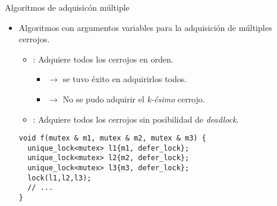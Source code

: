 \begin{frame}[fragile]{Algoritmos de adquisicón múltiple}
\begin{itemize}
  \item Algoritmos con argumentos variables para la adquisición de múltiples cerrojos.
    \begin{itemize}
      \item {}: Adquiere todos los cerrojos en orden. 
        \begin{itemize}
          \item {} $\rightarrow$ se tuvo éxito en adquirirlos todos.
          \item {} $\rightarrow$  No se pudo adquirir el \emph{k-ésimo} cerrojo.
        \end{itemize}
      \item {}: Adquiere todos los cerrojos sin posibilidad de \emph{deadlock}.
    \end{itemize}
\begin{lstlisting}
void f(mutex & m1, mutex & m2, mutex & m3) {
  unique_lock<mutex> l1{m1, defer_lock};
  unique_lock<mutex> l2{m2, defer_lock};
  unique_lock<mutex> l3{m3, defer_lock};
  lock(l1,l2,l3);
  // ...
}
\end{lstlisting}
\end{itemize}
\end{frame}
